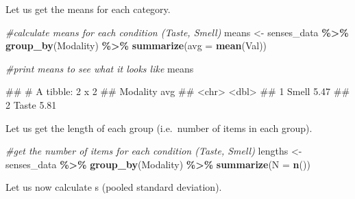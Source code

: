 \documentclass[
]{book}
\newenvironment{Shaded}{\begin{snugshade}}{\end{snugshade}}
\newcommand{\AttributeTok}[1]{\textcolor[rgb]{0.13,0.29,0.53}{#1}}
\newcommand{\CommentTok}[1]{\textcolor[rgb]{0.56,0.35,0.01}{\textit{#1}}}
\newcommand{\FunctionTok}[1]{\textcolor[rgb]{0.13,0.29,0.53}{\textbf{#1}}}
\newcommand{\NormalTok}[1]{#1}
\newcommand{\OtherTok}[1]{\textcolor[rgb]{0.56,0.35,0.01}{#1}}
\newcommand{\SpecialCharTok}[1]{\textcolor[rgb]{0.81,0.36,0.00}{\textbf{#1}}}
\begin{document}
Let us get the means for each category.

\begin{Shaded}
\begin{Highlighting}[]
\CommentTok{\#calculate means for each condition (Taste, Smell)}
\NormalTok{means }\OtherTok{\textless{}{-}}\NormalTok{ senses\_data }\SpecialCharTok{\%\textgreater{}\%} 
  \FunctionTok{group\_by}\NormalTok{(Modality) }\SpecialCharTok{\%\textgreater{}\%} 
  \FunctionTok{summarize}\NormalTok{(}\AttributeTok{avg =} \FunctionTok{mean}\NormalTok{(Val))}

\CommentTok{\#print means to see what it looks like}
\NormalTok{means}
\end{Highlighting}
\end{Shaded}

\begin{Shaded}
\begin{Highlighting}[]
\NormalTok{\#\# \# A tibble: 2 x 2}
\NormalTok{\#\#   Modality   avg}
\NormalTok{\#\#   \textless{}chr\textgreater{}    \textless{}dbl\textgreater{}}
\NormalTok{\#\# 1 Smell     5.47}
\NormalTok{\#\# 2 Taste     5.81}
\end{Highlighting}
\end{Shaded}

Let us get the length of each group (i.e.~number of items in each group).

\begin{Shaded}
\begin{Highlighting}[]
\CommentTok{\#get the number of items for each condition (Taste, Smell)}
\NormalTok{lengths  }\OtherTok{\textless{}{-}}\NormalTok{ senses\_data }\SpecialCharTok{\%\textgreater{}\%} 
  \FunctionTok{group\_by}\NormalTok{(Modality) }\SpecialCharTok{\%\textgreater{}\%} 
  \FunctionTok{summarize}\NormalTok{(}\AttributeTok{N =} \FunctionTok{n}\NormalTok{())}
\end{Highlighting}
\end{Shaded}

Let us now calculate s (pooled standard deviation).
\end{document}
